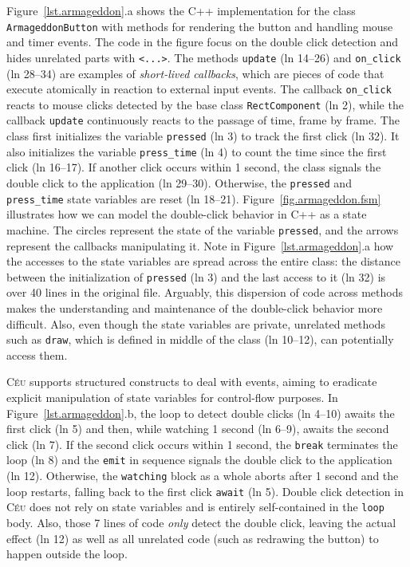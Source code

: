 \documentclass[10pt, conference, compsocconf]{IEEEtran}
\newcommand{\CEU}{\textsc{C\'{e}u}\xspace}
\newcommand{\code}[1] {{\small{\texttt{#1}}}}
\begin{document}
Figure~\ref{lst.armageddon}.a shows the C++ implementation for the class
\code{ArmageddonButton} with methods for rendering the button and handling
mouse and timer events.
The code in the figure focus on the double click detection and hides unrelated
parts with \code{<...>}.
%
The methods \code{update} (ln 14--26) and \code{on\_click} (ln 28--34) are
examples of \emph{short-lived callbacks}, which are pieces of code that execute
atomically in reaction to external input events.
The callback \code{on\_click} reacts to mouse clicks detected by the base class
\code{RectComponent} (ln 2), while the callback \code{update} continuously
reacts to the passage of time, frame by frame.
%
The class first initializes the variable \code{pressed} (ln 3) to track the
first click (ln 32).
It also initializes the variable \code{press\_time} (ln 4) to count the time
since the first click (ln 16--17).
If another click occurs within 1 second, the class signals the double click to
the application (ln 29--30).
Otherwise, the \code{pressed} and \code{press\_time} state variables are reset
(ln 18--21).
%
Figure~\ref{fig.armageddon.fsm} illustrates how we can model the double-click 
behavior in C++ as a state machine.
The circles represent the state of the variable \code{pressed}, and the arrows 
represent the callbacks manipulating it.
%
Note in Figure~\ref{lst.armageddon}.a how the accesses to the state variables
are spread across the entire class: the distance between the initialization of
\code{pressed} (ln  3) and the last access to it (ln 32) is over 40 lines in
the original file.
Arguably, this dispersion of code across methods makes the understanding and 
maintenance of the double-click behavior more difficult.
Also, even though the state variables are private, unrelated methods such as 
\code{draw}, which is defined in middle of the class (ln 10--12), can
potentially access them.

\CEU supports structured constructs to deal with events, aiming to eradicate
explicit manipulation of state variables for control-flow purposes.
%
In Figure~\ref{lst.armageddon}.b, the loop to detect double clicks (ln 4--10)
awaits the first click (ln 5) and then, while watching 1 second (ln 6--9),
awaits the second click (ln 7).
If the second click occurs within 1 second, the \code{break} terminates the
loop (ln 8) and the \code{emit} in sequence signals the double click to the
application (ln 12).
Otherwise, the \code{watching} block as a whole aborts after 1 second  and the
loop restarts, falling back to the first click \code{await} (ln 5).
%
Double click detection in \CEU does not rely on state variables and is entirely
self-contained in the \code{loop} body.
Also, those 7 lines of code \emph{only} detect the double click, leaving the
actual effect (ln 12) as well as all unrelated code (such as redrawing the
button) to happen outside the loop.
\end{document}
